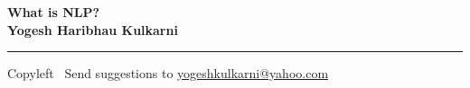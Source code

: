 
\graphicspath{{images/}}

\footnotesize


\begin{center}
\Large{\textbf{What is NLP?\\ Yogesh Haribhau Kulkarni}}  
\end{center}

\begin{multicols}{2}

\end{multicols}

\rule{\linewidth}{0.25pt}
\scriptsize
Copyleft \textcopyleft\  Send suggestions to 
\href{http://www.yogeshkulkarni.com}{yogeshkulkarni@yahoo.com}


